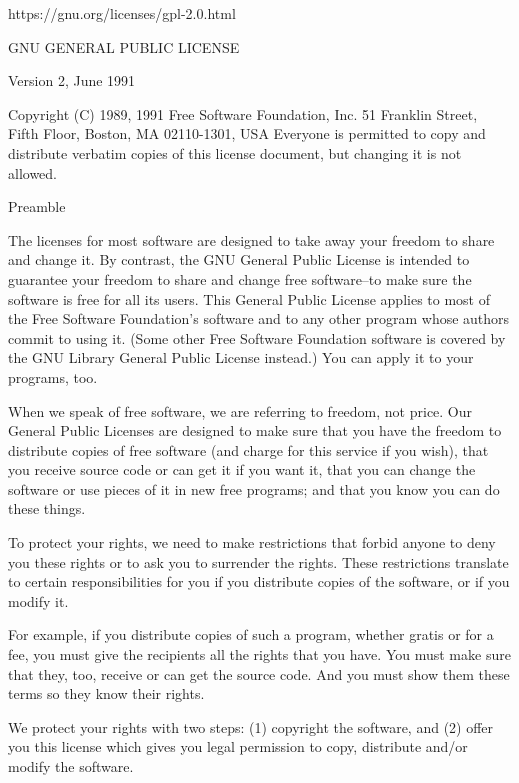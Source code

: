 https://gnu.org/licenses/gpl-2.0.html

\begin{center}
GNU GENERAL PUBLIC LICENSE

Version 2, June 1991
\end{center}

Copyright (C) 1989, 1991 Free Software Foundation, Inc.
51 Franklin Street, Fifth Floor, Boston, MA  02110-1301, USA
Everyone is permitted to copy and distribute verbatim copies
of this license document, but changing it is not allowed.

\begin{center}
Preamble
\end{center}

The licenses for most software are designed to take away your
freedom to share and change it.  By contrast, the GNU General Public
License is intended to guarantee your freedom to share and change free
software--to make sure the software is free for all its users.  This
General Public License applies to most of the Free Software
Foundation's software and to any other program whose authors commit to
using it.  (Some other Free Software Foundation software is covered by
the GNU Library General Public License instead.)  You can apply it to
your programs, too.

When we speak of free software, we are referring to freedom, not
price.  Our General Public Licenses are designed to make sure that you
have the freedom to distribute copies of free software (and charge for
this service if you wish), that you receive source code or can get it
if you want it, that you can change the software or use pieces of it
in new free programs; and that you know you can do these things.

To protect your rights, we need to make restrictions that forbid
anyone to deny you these rights or to ask you to surrender the rights.
These restrictions translate to certain responsibilities for you if you
distribute copies of the software, or if you modify it.

For example, if you distribute copies of such a program, whether
gratis or for a fee, you must give the recipients all the rights that
you have.  You must make sure that they, too, receive or can get the
source code.  And you must show them these terms so they know their
rights.

We protect your rights with two steps: (1) copyright the software, and
(2) offer you this license which gives you legal permission to copy,
distribute and/or modify the software.

